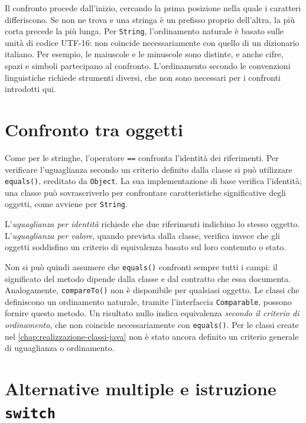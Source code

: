 Il confronto procede dall'inizio, cercando la prima posizione nella
quale i caratteri differiscono. Se non ne trova e una stringa è un
prefisso proprio dell'altra, la più corta precede la più lunga. Per
\texttt{String}, l'ordinamento naturale è basato sulle unità di codice
UTF-16: non coincide necessariamente con quello di un dizionario
italiano. Per esempio, le maiuscole e le minuscole sono distinte, e
anche cifre, spazi e simboli partecipano al confronto. L'ordinamento
secondo le convenzioni linguistiche richiede strumenti diversi, che
non sono necessari per i confronti introdotti qui.

\section{Confronto tra oggetti}
\label{sec:fi-java-cicli-oggetti}

Come per le stringhe, l'operatore \texttt{==} confronta l'identità
dei riferimenti. Per verificare l'uguaglianza secondo un criterio
definito dalla classe si può utilizzare \texttt{equals()}, ereditato
da \texttt{Object}. La sua implementazione di base verifica
l'identità; una classe può sovrascriverlo per confrontare
caratteristiche significative degli oggetti, come avviene per
\texttt{String}.

\begin{definition}
\label{def:fi-java-cicli-uguaglianza-oggetti}
L'\emph{uguaglianza per identità} richiede che due riferimenti
indichino lo stesso oggetto. L'\emph{uguaglianza per valore}, quando
prevista dalla classe, verifica invece che gli oggetti soddisfino
un criterio di equivalenza basato sul loro contenuto o stato.
\end{definition}

Non si può quindi assumere che \texttt{equals()} confronti sempre
tutti i campi: il significato del metodo dipende dalla classe e dal
contratto che essa documenta. Analogamente, \texttt{compareTo()}
non è disponibile per qualsiasi oggetto. Le classi che definiscono
un ordinamento naturale, tramite l'interfaccia \texttt{Comparable},
possono fornire questo metodo. Un risultato nullo indica equivalenza
\emph{secondo il criterio di ordinamento}, che non coincide
necessariamente con \texttt{equals()}. Per le classi create nel
\cref{chap:realizzazione-classi-java} non è stato ancora definito
un criterio generale di uguaglianza o ordinamento.

\section{Alternative multiple e istruzione \texttt{switch}}
\label{sec:fi-java-cicli-alternative}

